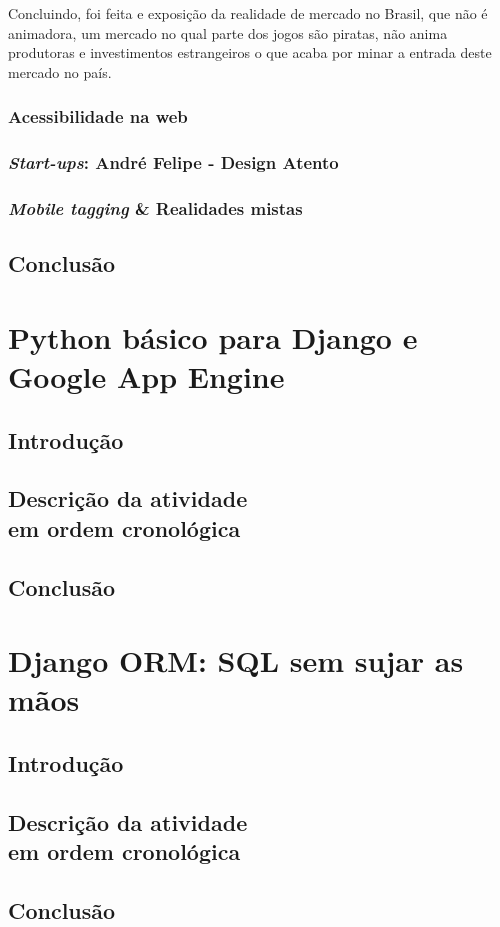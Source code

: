 \documentclass[a4paper]{report}
\begin{document}
            Concluindo, foi feita e exposição da realidade de mercado no
            Brasil, que não é animadora, um mercado no qual parte dos jogos
            são piratas, não anima produtoras e investimentos estrangeiros
            o que acaba por minar a entrada deste mercado no país.

            \subsection{Acessibilidade na web}

            \subsection{\emph{Start-ups}: André Felipe - Design Atento}

            \subsection{\emph{Mobile tagging} \& Realidades mistas}

        \section{Conclusão}

    \chapter[Python básico]{Python básico para Django e Google App Engine}

        \section{Introdução}

        \section[Descrição atividade]{Descrição da atividade
        \\em ordem cronológica}

        \section{Conclusão}

    \chapter[Django ORM]{Django ORM: SQL sem sujar as mãos}

        \section{Introdução}

        \section[Descrição atividade]{Descrição da atividade
        \\em ordem cronológica}

        \section{Conclusão}
\end{document}
